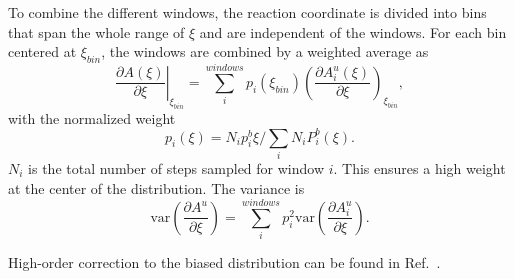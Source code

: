 To combine the different windows, the reaction coordinate is divided into bins that span the whole range of $\xi$ and are independent of the windows. For each bin centered at $\xi_{bin}$, the windows are combined by a weighted average as
\begin{equation}
    \left.\frac{\partial A(\xi)}{\partial \xi}\right\vert_{\xi_{bin}}=\sum_{i}^{windows}p_i(\xi_{bin})\left(\frac{\partial A_i^u(\xi)}{\partial \xi}\right)_{\xi_{bin}},
\end{equation}
with the normalized weight
\begin{equation}
    p_i(\xi)=N_ip_i^b{\xi}/\sum_i N_iP_i^b(\xi).
\end{equation}
$N_i$ is the total number of steps sampled for window $i$. This ensures a high weight at the center of the distribution. The variance is
\begin{equation}
    \mathrm{var}\left(\frac{\partial A^u}{\partial \xi}\right)=\sum_{i}^{windows}p_i^2\mathrm{var}\left(\frac{\partial A_i^u}{\partial \xi}\right).
\end{equation}

High-order correction to the biased distribution can be found in Ref.~\cite{KaestnerJCP2012}.